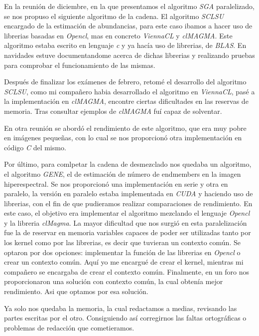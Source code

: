 En la reunión de diciembre, en la que presentamos el algoritmo \textit{SGA} paralelizado, se nos propuso el siguiente algoritmo de la cadena. El algoritmo \textit{SCLSU} encargado de la estimación de abundancias, para este caso ibamos a hacer uso de librerias basadas en \textit{Opencl}, mas en concreto \textit{ViennaCL} y \textit{clMAGMA}. Este algoritmo estaba escrito en lenguaje \textit{c} y ya hacía uso de librerias, de \textit{BLAS}. En navidades estuve documentandome acerca de dichas librerias y realizando pruebas para comprobar el funcionamiento de las mismas.

Después de finalizar los exámenes de febrero, retomé el desarrollo del algoritmo \textit{SCLSU}, como mi compañero habia desarrollado el algoritmo en \textit{ViennaCL}, pasé a la implementación en \textit{clMAGMA}, encontre ciertas dificultades en las reservas de memoria. Tras consultar ejemplos de \textit{clMAGMA} fuí capaz de solventar.

En otra reunión se abordó el rendimiento de este algoritmo, que era muy pobre en imágenes pequeñas, con lo cual se nos proporcionó otra implementación en código \textit{C} del mismo.

Por último, para comlpetar la cadena de desmezclado nos quedaba un algoritmo, el algoritmo \textit{GENE}, el de estimación de número de endmembers en la imagen hiperespectral. Se nos proporcionó una implementación en serie y otra en paralelo, la versión en paralelo estaba implementada en \textit{CUDA} y haciendo uso de librerias, con el fin de que pudieramos realizar comparaciones de rendimiento. En este caso, el objetivo era implementar el algoritmo mezclando el lenguaje \textit{Opencl} y la libreria \textit{clMagma}. La mayor dificultad que nos surgió en esta paralelización fue la de reservar en memoria variables capaces de poder ser utilizadas tanto por los kernel como por las librerias, es decir que tuvieran un contexto común. Se optaron por dos opciones: implementar la función de las librerias en \textit{Opencl} o crear un contexto común. Aquí yo me encargué de crear el kernel, mientras mi compañero se encargaba de crear el contexto común. Finalmente, en un foro nos proporcionaron una solución con contexto común, la cual obtenía mejor rendimiento. Asi que optamos por esa solución.

Ya solo nos quedaba la memoria, la cual redactamos a medias, revisando las partes escritas por el otro. Consiguiendo así corregirnos las faltas ortográficas o problemas de redacción que cometieramos.

